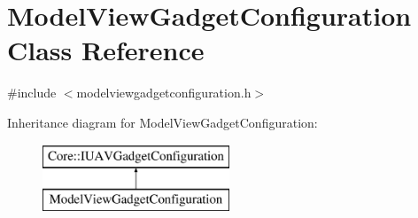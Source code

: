 \hypertarget{class_model_view_gadget_configuration}{\section{\-Model\-View\-Gadget\-Configuration \-Class \-Reference}
\label{class_model_view_gadget_configuration}
}


{\ttfamily \#include $<$modelviewgadgetconfiguration.\-h$>$}

\-Inheritance diagram for \-Model\-View\-Gadget\-Configuration\-:\begin{figure}[H]
\begin{center}
\leavevmode
\includegraphics[height=2.000000cm]{class_model_view_gadget_configuration}
\end{center}
\end{figure}
